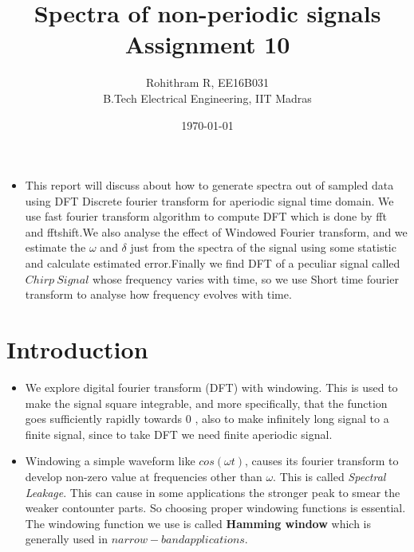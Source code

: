 \documentclass[10pt,a4paper]{article}
\providecommand{\tightlist}{%
      \setlength{\itemsep}{0pt}\setlength{\parskip}{0pt}}
\begin{document}
    
    
    \title{Spectra of non-periodic signals \\ Assignment 10}\author{Rohithram R, EE16B031 \\ B.Tech Electrical Engineering, IIT Madras}

\date{\today}
\maketitle


    
    

    
	
	\begin{abstract}
	\end{abstract}
    \begin{itemize}
\tightlist
\item
  This report will discuss about how to generate spectra out of sampled
  data using DFT Discrete fourier transform for aperiodic signal time
  domain. We use fast fourier transform algorithm to compute DFT which
  is done by fft and fftshift.We also analyse the effect of Windowed
  Fourier transform, and we estimate the \(\omega\) and \(\delta\) just
  from the spectra of the signal using some statistic and calculate
  estimated error.Finally we find DFT of a peculiar signal called
  \(Chirp \ Signal\) whose frequency varies with time, so we use Short
  time fourier transform to analyse how frequency evolves with time.
\end{itemize}

	

	
		
    \section{Introduction}\label{introduction}

\begin{itemize}
\item
  We explore digital fourier transform (DFT) with windowing. This is
  used to make the signal square integrable, and more specifically, that
  the function goes sufficiently rapidly towards 0 , also to make
  infinitely long signal to a finite signal, since to take DFT we need
  finite aperiodic signal.
\item
  Windowing a simple waveform like \(cos(\omega t)\), causes its fourier
  transform to develop non-zero value at frequencies other than
  \(\omega\). This is called \emph{Spectral Leakage}. This can cause in
  some applications the stronger peak to smear the weaker contounter
  parts. So choosing proper windowing functions is essential. The
  windowing function we use is called \textbf{Hamming window} which is
  generally used in \(narrow-band applications\).
\end{itemize}
\end{document}
